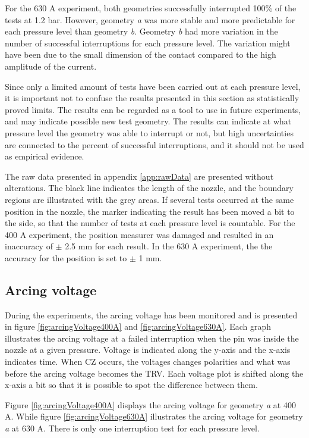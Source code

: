 \documentclass[10pt,a4paper,twoside]{article}
\begin{document}
For the 630 A experiment, both geometries successfully interrupted 100\% of the tests at 1.2 bar. However, geometry \textit{a} was more stable and more predictable for each pressure level than geometry \textit{b}. Geometry \textit{b} had more variation in the number of successful interruptions for each pressure level. The variation might have been due to the small dimension of the contact compared to the high amplitude of the current.

Since only a limited amount of tests have been carried out at each pressure level, it is important not to confuse the results presented in this section as statistically proved limits. The results can be regarded as a tool to use in future experiments, and may indicate possible new test geometry. The results can indicate at what pressure level the geometry was able to interrupt or not, but high uncertainties are connected to the percent of successful interruptions, and it should not be used as empirical evidence.

The raw data presented in appendix \ref{app:rawData} are presented without alterations. The black line indicates the length of the nozzle, and the boundary regions are illustrated with the grey areas. If several tests occurred at the same position in the nozzle, the marker indicating the result has been moved a bit to the side, so that the number of tests at each pressure level is countable. For the 400 A experiment, the position measurer was damaged and resulted in an inaccuracy of $\pm$ 2.5 mm for each result. In the 630 A experiment, the the accuracy for the position is set to $\pm$ 1 mm.

\newpage
\subsection{Arcing voltage}
During the experiments, the arcing voltage has been monitored and is presented in figure \ref{fig:arcingVoltage400A} and \ref{fig:arcingVoltage630A}. Each graph illustrates the arcing voltage at a failed interruption when the pin was inside the nozzle at a given pressure. Voltage is indicated along the y-axis and the x-axis indicates time. When CZ occurs, the voltages changes polarities and what was before the arcing voltage becomes the TRV. Each voltage plot is shifted along the x-axis a bit so that it is possible to spot the difference between them.

Figure \ref{fig:arcingVoltage400A} displays the arcing voltage for geometry \textit{a} at 400 A. While figure \ref{fig:arcingVoltage630A} illustrates the arcing voltage for geometry \textit{a} at 630 A. There is only one interruption test for each pressure level.
\end{document}
